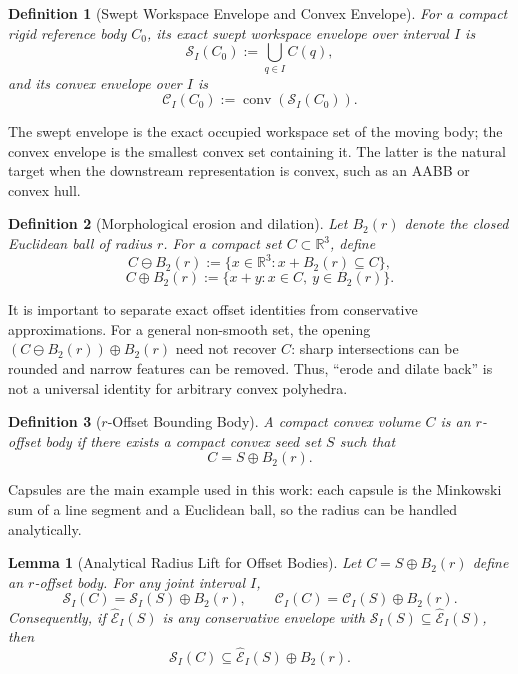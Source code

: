 \documentclass[journal]{IEEEtran}
\newtheorem{definition}{Definition}
\newtheorem{lemma}{Lemma}
\newcommand{\Real}{\ensuremath{\mathbb{R}}}
\begin{document}
\begin{definition}[Swept Workspace Envelope and Convex Envelope]
For a compact rigid reference body $C_0$, its exact swept workspace envelope
over interval $I$ is
\[
\mathcal{S}_I(C_0) := \bigcup_{q\in I} C(q),
\]
and its convex envelope over $I$ is
\[
\mathcal{C}_I(C_0) := \operatorname{conv}(\mathcal{S}_I(C_0)).
\]
\end{definition}

The swept envelope is the exact occupied workspace set of the moving body; the
convex envelope is the smallest convex set containing it. The latter is the
natural target when the downstream representation is convex, such as an AABB or
convex hull.

\begin{definition}[Morphological erosion and dilation]
Let $B_2(r)$ denote the closed Euclidean ball of radius $r$. For a compact set
$C \subset \Real^3$, define
\[
C \ominus B_2(r) := \{x \in \Real^3 : x + B_2(r) \subseteq C\},
\]
\[
C \oplus B_2(r) := \{x+y : x\in C,\ y\in B_2(r)\}.
\]
\end{definition}

It is important to separate exact offset identities from conservative
approximations. For a general non-smooth set, the opening
$(C \ominus B_2(r)) \oplus B_2(r)$ need not recover $C$: sharp intersections
can be rounded and narrow features can be removed. Thus, ``erode and dilate
back'' is not a universal identity for arbitrary convex polyhedra.

\begin{definition}[$r$-Offset Bounding Body]
A compact convex volume $C$ is an $r$-offset body if there exists a compact
convex seed set $S$ such that
\[
C = S \oplus B_2(r).
\]
\end{definition}

Capsules are the main example used in this work: each capsule is the Minkowski
sum of a line segment and a Euclidean ball, so the radius can be handled
analytically.

\begin{lemma}[Analytical Radius Lift for Offset Bodies]\label{lem:offset_lift}
Let $C = S \oplus B_2(r)$ define an $r$-offset body. For any joint interval $I$,
\[
\mathcal{S}_I(C) = \mathcal{S}_I(S) \oplus B_2(r),
\qquad
\mathcal{C}_I(C) = \mathcal{C}_I(S) \oplus B_2(r).
\]
Consequently, if $\widehat{\mathcal{E}}_I(S)$ is any conservative envelope with
$\mathcal{S}_I(S) \subseteq \widehat{\mathcal{E}}_I(S)$, then
\[
\mathcal{S}_I(C) \subseteq \widehat{\mathcal{E}}_I(S) \oplus B_2(r).
\]
\end{lemma}
\end{document}
